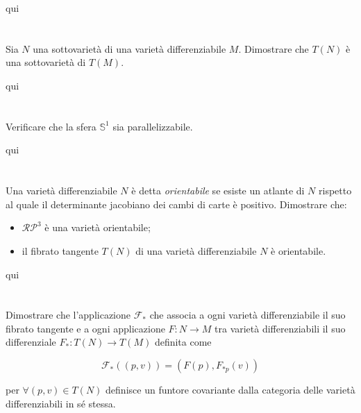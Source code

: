 qui




\section{}\label{es2-25}

\begin{tcolorbox}
	Sia $ N $ una sottovarietà di una varietà differenziabile $ M $. Dimostrare che $ T(N) $ è una sottovarietà di $ T(M) $.
\end{tcolorbox}

qui

\section{}\label{BONUS2-4}

\begin{tcolorbox}
	Verificare che la sfera $ \mathbb{S}^{1} $ sia parallelizzabile.
\end{tcolorbox}

qui

\section{}\label{es2-26}

\begin{tcolorbox}
	Una varietà differenziabile $ N $ è detta \textit{orientabile} se esiste un atlante di $ N $ rispetto al quale il determinante jacobiano dei cambi di carte è positivo. Dimostrare che:
	
	\begin{itemize}
		\item $ \mathcal{RP}^{3} $ è una varietà orientabile;
		\item il fibrato tangente $ T(N) $ di una varietà differenziabile $ N $ è orientabile.
	\end{itemize}
\end{tcolorbox}

qui

\section{}\label{es2-27}

\begin{tcolorbox}
	Dimostrare che l'applicazione $ \mathcal{F}_{*} $ che associa a ogni varietà differenziabile il suo fibrato tangente e a ogni applicazione $ F : N \to M $ tra varietà differenziabili il suo differenziale $ F_{*} : T(N) \to T(M) $ definita come
	
	\begin{equation}
		\mathcal{F}_{*}((p,v)) = (F(p), F_{*p}(v))
	\end{equation}

	per $ \forall (p,v) \in T(N) $ definisce un funtore covariante dalla categoria delle varietà differenziabili in sé stessa.
\end{tcolorbox}

